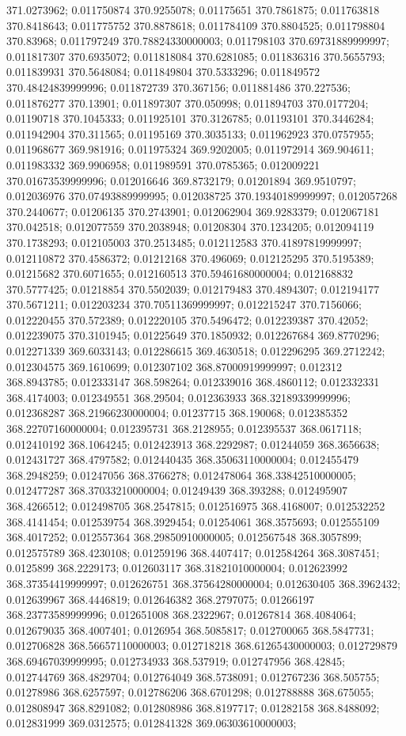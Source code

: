 371.0273962; 0.011750874 370.9255078; 0.01175651 370.7861875; 0.011763818 370.8418643; 0.011775752 370.8878618; 0.011784109 370.8804525; 0.011798804 370.83968; 0.011797249 370.78824330000003; 0.011798103 370.69731889999997; 0.011817307 370.6935072; 0.011818084 370.6281085; 0.011836316 370.5655793; 0.011839931 370.5648084; 0.011849804 370.5333296; 0.011849572 370.48424839999996; 0.011872739 370.367156; 0.011881486 370.227536; 0.011876277 370.13901; 0.011897307 370.050998; 0.011894703 370.0177204; 0.01190718 370.1045333; 0.011925101 370.3126785; 0.01193101 370.3446284; 0.011942904 370.311565; 0.01195169 370.3035133; 0.011962923 370.0757955; 0.011968677 369.981916; 0.011975324 369.9202005; 0.011972914 369.904611; 0.011983332 369.9906958; 0.011989591 370.0785365; 0.012009221 370.01673539999996; 0.012016646 369.8732179; 0.01201894 369.9510797; 0.012036976 370.07493889999995; 0.012038725 370.19340189999997; 0.012057268 370.2440677; 0.01206135 370.2743901; 0.012062904 369.9283379; 0.012067181 370.042518; 0.012077559 370.2038948; 0.01208304 370.1234205; 0.012094119 370.1738293; 0.012105003 370.2513485; 0.012112583 370.41897819999997; 0.012110872 370.4586372; 0.01212168 370.496069; 0.012125295 370.5195389; 0.01215682 370.6071655; 0.012160513 370.59461680000004; 0.012168832 370.5777425; 0.01218854 370.5502039; 0.012179483 370.4894307; 0.012194177 370.5671211; 0.012203234 370.70511369999997; 0.012215247 370.7156066; 0.012220455 370.572389; 0.012220105 370.5496472; 0.012239387 370.42052; 0.012239075 370.3101945; 0.01225649 370.1850932; 0.012267684 369.8770296; 0.012271339 369.6033143; 0.012286615 369.4630518; 0.012296295 369.2712242; 0.012304575 369.1610699; 0.012307102 368.87000919999997; 0.012312 368.8943785; 0.012333147 368.598264; 0.012339016 368.4860112; 0.012332331 368.4174003; 0.012349551 368.29504; 0.012363933 368.32189339999996; 0.012368287 368.21966230000004; 0.01237715 368.190068; 0.012385352 368.22707160000004; 0.012395731 368.2128955; 0.012395537 368.0617118; 0.012410192 368.1064245; 0.012423913 368.2292987; 0.01244059 368.3656638; 0.012431727 368.4797582; 0.012440435 368.35063110000004; 0.012455479 368.2948259; 0.01247056 368.3766278; 0.012478064 368.33842510000005; 0.012477287 368.37033210000004; 0.01249439 368.393288; 0.012495907 368.4266512; 0.012498705 368.2547815; 0.012516975 368.4168007; 0.012532252 368.4141454; 0.012539754 368.3929454; 0.01254061 368.3575693; 0.012555109 368.4017252; 0.012557364 368.29850910000005; 0.012567548 368.3057899; 0.012575789 368.4230108; 0.01259196 368.4407417; 0.012584264 368.3087451; 0.0125899 368.2229173; 0.012603117 368.31821010000004; 0.012623992 368.37354419999997; 0.012626751 368.37564280000004; 0.012630405 368.3962432; 0.012639967 368.4446819; 0.012646382 368.2797075; 0.01266197 368.23773589999996; 0.012651008 368.2322967; 0.01267814 368.4084064; 0.012679035 368.4007401; 0.0126954 368.5085817; 0.012700065 368.5847731; 0.012706828 368.56657110000003; 0.012718218 368.61265430000003; 0.012729879 368.69467039999995; 0.012734933 368.537919; 0.012747956 368.42845; 0.012744769 368.4829704; 0.012764049 368.5738091; 0.012767236 368.505755; 0.01278986 368.6257597; 0.012786206 368.6701298; 0.012788888 368.675055; 0.012808947 368.8291082; 0.012808986 368.8197717; 0.01282158 368.8488092; 0.012831999 369.0312575; 0.012841328 369.06303610000003; 